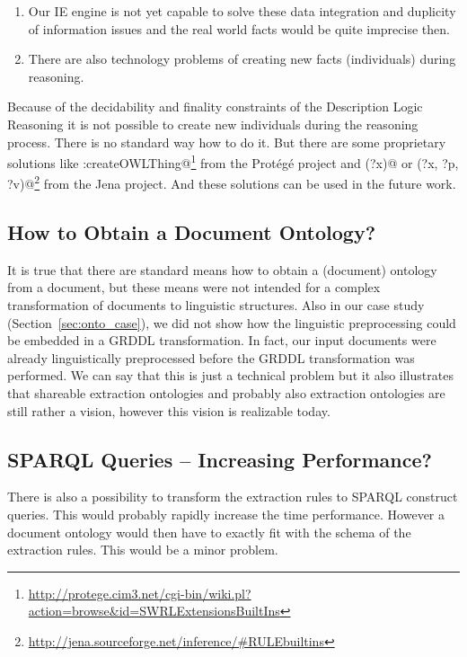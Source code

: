 \begin{enumerate}
	\item Our IE engine is not yet capable to solve these data integration and duplicity of information issues and the real world facts would be quite imprecise then.
	\item There are also technology problems of creating new facts (individuals) during reasoning.
\end{enumerate}

Because of the decidability and finality constraints of the Description Logic Reasoning it is not possible to create new individuals during the reasoning process. There is no standard way how to do it. But there are some proprietary solutions like \verb@swrlx:createOWLThing@\footnote{\url{http://protege.cim3.net/cgi-bin/wiki.pl?action=browse&id=SWRLExtensionsBuiltIns}} from the Prot\'{e}g\'{e} project and \verb@makeTemp(?x)@ or \verb@makeInstance(?x, ?p, ?v)@\footnote{\url{http://jena.sourceforge.net/inference/#RULEbuiltins}} from the Jena project.
And these solutions can be used in the future work. 

\subsection{How to Obtain a Document Ontology?}

It is true that there are standard means how to obtain a (document) ontology from a document, but these means were not intended for a complex transformation of documents to linguistic structures. Also in our case study (Section~\ref{sec:onto_case}), we did not show how the linguistic preprocessing could be embedded in a GRDDL transformation. In fact, our input documents were already linguistically preprocessed before the GRDDL transformation was performed. We can say that this is just a technical problem but it also illustrates that shareable extraction ontologies and probably also extraction ontologies are still rather a vision, however this vision is realizable today.

\subsection{SPARQL Queries -- Increasing Performance?}

There is also a possibility to transform the extraction rules to SPARQL construct queries. This would probably rapidly increase the time performance. However a document ontology would then have to exactly fit with the schema of the extraction rules.  This would be a minor problem. 

